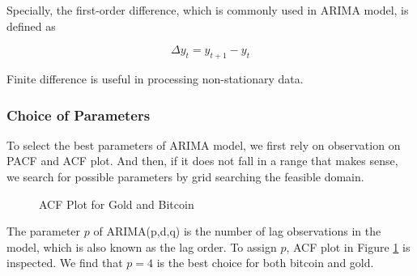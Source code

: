 \documentclass[12pt,a4paper]{article}
\newcommand{\Predictor}{ARIMA }
\begin{document}
\begin{spacing}{1.2}
Specially, the first-order difference, which is commonly used in \Predictor model, is defined as

$$
\Delta y_t = y_{t+1} - y_{t}
$$

Finite difference is useful in processing non-stationary data.

\subsubsection{Choice of Parameters}

To select the best parameters of ARIMA model, we first rely on observation on PACF and ACF plot. And then, if it does not fall in a range that makes sense, we search for possible parameters by grid searching the feasible domain.

\begin{figure}
	\begin{center}
		\caption{ACF Plot for Gold and Bitcoin}
		\label{fig:acf}
	\end{center}
\end{figure}

The parameter $p$ of ARIMA(p,d,q) is the number of lag observations in the model, which is also known as the lag order. To assign $p$, ACF plot in Figure \ref{fig:acf} is inspected. We find that $p=4$ is the best choice for both bitcoin and gold.


\end{spacing}
\end{document}
